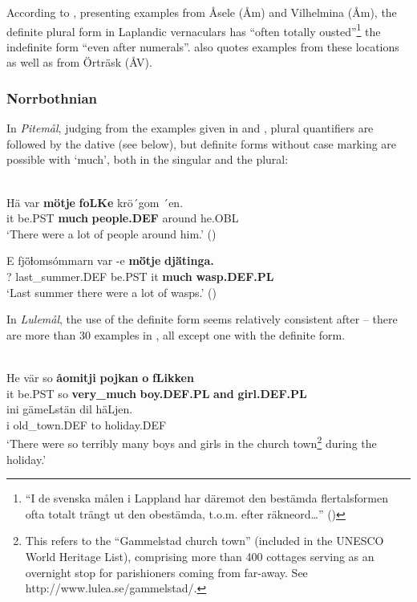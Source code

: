According to \citet[282]{ÅgrenEtAl1954}, presenting examples from Åsele (Åm) and Vilhelmina (Åm), the definite plural form in Laplandic vernaculars has “often totally ousted”\footnote{ “I de svenska målen i Lappland har däremot den bestämda flertalsformen ofta totalt trängt ut den obestämda, t.o.m. efter räkneord…” (\citet[282]{ÅgrenEtAl1954})} the indefinite form “even after numerals”.  \citet[17]{Delsing2003a} also quotes examples from these locations as well as from Örträsk (ÅV). 

\subsubsection{Norrbothnian}
 In \textit{Pitemål}, judging from the examples given in \citet{Brännström1993} and \citet{LidströmEtAl1991}, plural quantifiers are followed by the dative (see below), but definite forms without case marking are possible with  ‘much’, both in the singular and the plural:

\ea\label{}
\\
\gll Hä  var  \textbf{mö{\textasciigrave}tje} \textbf{  foLKe} krö´gom  ´en.\\
it  be.PST  \textbf{much} \textbf{people.DEF} around  he.OBL\\
\glt ‘There were a lot of people around him.’ (\citet[52]{Brännström1993})

\z

\ea
\gll E  fj\={ö}ƚomsómmarn  var  {}-e  \textbf{m\={ö}tje} \textbf{  dj\={ä}tinga.}\\
?  last\_summer.DEF  be.PST  it  \textbf{much} \textbf{wasp.DEF.PL}\\
\glt ‘Last summer there were a lot of wasps.’ (\citet[93]{BerglundEtAl1991})

\z

In \textit{Lulemål}, the use of the definite form seems relatively consistent after  – there are more than 30 examples in \citet{Nyström1993}, all except one with the definite form. 

\ea \label{} 
\\
\gll He  vär  so  \textbf{åomitji} \textbf{pojkan} \textbf{o} \textbf{fLikken}\\
it  be.PST  so  \textbf{very\_much} \textbf{boy.DEF.PL} \textbf{and} \textbf{girl.DEF.PL}\\
\gll ini  gämeLstän  dil  häLjen.\\
i  old\_town.DEF  to  holiday.DEF\\
\glt ‘There were so terribly many boys and girls in the church town\footnote{ This refers to the “Gammelstad church town” (included in the UNESCO World Heritage List), comprising more than 400 cottages serving as an overnight stop for parishioners coming from far-away. See http://www.lulea.se/gammelstad/.} during the holiday.’

